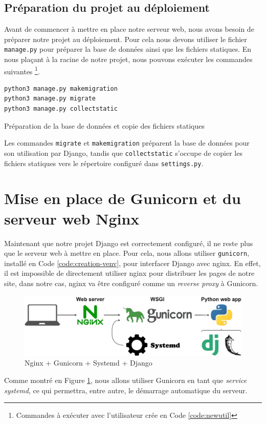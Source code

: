 \documentclass{article}
\begin{document}
        \subsection{Préparation du projet au déploiement}
        Avant de commencer à mettre en place notre serveur web, nous avons besoin de préparer notre projet au déploiement.
        Pour cela nous devons utiliser le fichier \verb|manage.py| pour préparer la base de données ainsi que les fichiers statiques. En nous plaçant à la racine de notre projet, nous pouvons exécuter les commandes suivantes
        \footnote{Commandes à exécuter avec l'utilisateur crée en Code \ref{code:newutil}}.
        \begin{listing}[H]
            \begin{verbatim}
python3 manage.py makemigration
python3 manage.py migrate
python3 manage.py collectstatic
            \end{verbatim}
            \caption{Préparation de la base de données et copie des fichiers statiques}
            \label{code:manage.py}
        \end{listing}
        Les commandes \verb|migrate| et \verb|makemigration| préparent la base de données pour son utilisation par Django, tandis que \verb|collectstatic| s'occupe de copier les fichiers statiques vers le répertoire configuré dans \verb|settings.py|.

\section{Mise en place de Gunicorn et du serveur web Nginx}
    Maintenant que notre projet Django est correctement configuré, il ne reste plus que le serveur web à mettre en place. Pour cela, nous allons utiliser \verb|gunicorn|, installé en Code \ref{code:creation-venv}, pour interfacer Django avec nginx.
    En effet, il est impossible de directement utiliser nginx pour distribuer les pages de notre site, dans notre cas, nginx va être configuré comme un \emph{reverse proxy} à Gunicorn.
    \begin{figure}[H]
        \includegraphics[width=\linewidth]{fig/gunicorn.jpeg}
        \caption{Nginx + Gunicorn + Systemd + Django}
        \label{fig:gunicorn}
    \end{figure}
    Comme montré en Figure \ref{fig:gunicorn}, nous allons utiliser Gunicorn en tant que \emph{service systemd}, ce qui permettra, entre autre, le démarrage automatique du serveur.
\end{document}
